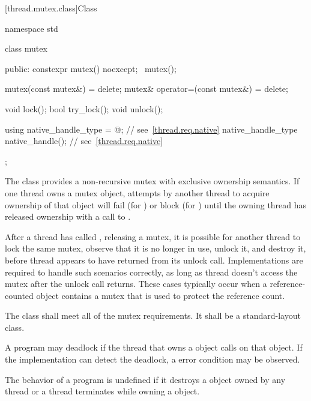 [thread.mutex.class]{Class }

%
\begin{codeblock}
namespace std {
  class mutex {
  public:
    constexpr mutex() noexcept;
    ~mutex();

    mutex(const mutex&) = delete;
    mutex& operator=(const mutex&) = delete;

    void lock();
    bool try_lock();
    void unlock();

    using native_handle_type = @\impdefnc@;          // see~\ref{thread.req.native}
    native_handle_type native_handle();                         // see~\ref{thread.req.native}
  };
}
\end{codeblock}

\pnum
The class  provides a non-recursive mutex with exclusive ownership
semantics. If one thread owns a mutex object, attempts by another thread to acquire
ownership of that object will fail (for ) or block (for
) until the owning thread has released ownership with a call to
.

\pnum
\begin{note}
After a thread  has called , releasing a mutex, it is possible for another
thread  to lock the same mutex, observe that it is no longer in use, unlock it, and
destroy it, before thread  appears to have returned from its unlock call. Implementations
are required to handle such scenarios correctly, as long as thread  doesn't access the
mutex after the unlock call returns. These cases typically occur when a reference-counted object
contains a mutex that is used to protect the reference count.
\end{note}

\pnum
The class  shall meet all of the mutex
requirements. It shall be a standard-layout
class.

\pnum
\begin{note} A program may deadlock if the thread that owns a  object calls
 on that object. If the implementation can detect the deadlock,
a  error condition may be observed. \end{note}

\pnum
The behavior of a program is undefined if
it destroys a  object owned by any thread or
a thread terminates while owning a  object.

